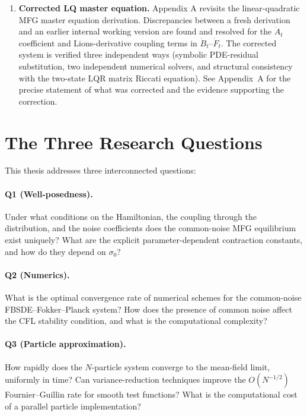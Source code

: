 \begin{enumerate}
    \item \textbf{Corrected LQ master equation.} Appendix A revisits the
    linear-quadratic MFG master equation derivation. Discrepancies between a
    fresh derivation and an earlier internal working version are found and resolved
    for the $\dot{A}_t$ coefficient and Lions-derivative coupling terms in
    $\dot{B}_t$--$\dot{F}_t$. The corrected system is
    verified three independent ways (symbolic PDE-residual substitution, two
    independent numerical solvers, and structural consistency with the two-state
    LQR matrix Riccati equation). See Appendix~A for the precise statement of
    what was corrected and the evidence supporting the correction.
\end{enumerate}

\section{The Three Research Questions}

This thesis addresses three interconnected questions:

\paragraph{Q1 (Well-posedness).} Under what conditions on the Hamiltonian, the
coupling through the distribution, and the noise coefficients does the common-noise
MFG equilibrium exist uniquely? What are the explicit parameter-dependent contraction
constants, and how do they depend on $\sigma_0$?

\paragraph{Q2 (Numerics).} What is the optimal convergence rate of numerical schemes
for the common-noise FBSDE--Fokker--Planck system? How does the presence of common
noise affect the CFL stability condition, and what is the computational complexity?

\paragraph{Q3 (Particle approximation).} How rapidly does the $N$-particle system
converge to the mean-field limit, uniformly in time? Can variance-reduction
techniques improve the $O(N^{-1/2})$ Fournier--Guillin rate for smooth test
functions? What is the computational cost of a parallel particle implementation?

